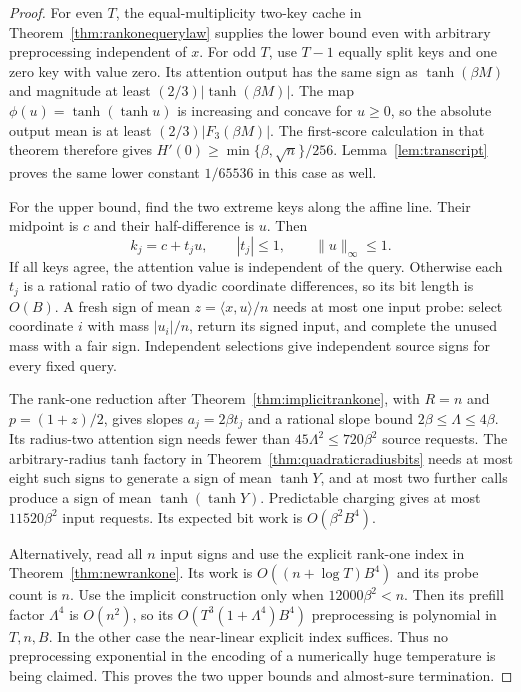 \begin{proof}
For even $T$, the equal-multiplicity two-key cache in
Theorem~\ref{thm:rankonequerylaw} supplies the lower bound even
with arbitrary preprocessing independent of $x$.
For odd $T$, use $T-1$ equally split keys and one zero key with
value zero. Its attention output has the same sign as
$\tanh(\beta M)$ and magnitude at least
$(2/3)|\tanh(\beta M)|$. The map
$\phi(u)=\tanh(\tanh u)$ is increasing and concave for $u\ge0$,
so the absolute output mean is at least $(2/3)|F_3(\beta M)|$.
The first-score calculation in that theorem therefore gives
$H'(0)\ge\min\{\beta,\sqrt n\}/256$.
Lemma~\ref{lem:transcript} proves the same lower constant
$1/65536$ in this case as well.

For the upper bound, find the two extreme keys along the affine line.
Their midpoint is $c$ and their half-difference is $u$. Then
\[
 k_j=c+t_ju,\qquad |t_j|\le1,\qquad \|u\|_\infty\le1.
\]
If all keys agree, the attention value is independent of the query.
Otherwise each $t_j$ is a rational ratio of two dyadic coordinate
differences, so its bit length is $O(B)$. A fresh sign of mean
$z=\langle x,u\rangle/n$ needs at most one input probe: select
coordinate $i$ with mass $|u_i|/n$, return its signed input, and
complete the unused mass with a fair sign. Independent selections
give independent source signs for every fixed query.

The rank-one reduction after Theorem~\ref{thm:implicitrankone}, with
$R=n$ and $p=(1+z)/2$, gives slopes $a_j=2\beta t_j$ and a rational
slope bound $2\beta\le\Lambda\le4\beta$.
Its radius-two attention sign needs fewer than
$45\Lambda^2\le720\beta^2$ source requests.
The arbitrary-radius tanh factory in
Theorem~\ref{thm:quadraticradiusbits} needs at most eight such signs
to generate a sign of mean $\tanh Y$, and at most two further
calls produce a sign of mean $\tanh(\tanh Y)$.
Predictable charging gives at most $11520\beta^2$ input requests.
Its expected bit work is $O(\beta^2B^4)$.

Alternatively, read all $n$ input signs and use the explicit
rank-one index in Theorem~\ref{thm:newrankone}. Its work is
$O((n+\log T)B^4)$ and its probe count is $n$.
Use the implicit construction only when $12000\beta^2<n$.
Then its prefill factor $\Lambda^4$ is $O(n^2)$, so its
$O(T^3(1+\Lambda^4)B^4)$ preprocessing is polynomial in
$T,n,B$. In the other case the near-linear explicit index
suffices. Thus no preprocessing exponential in the encoding of
a numerically huge temperature is being claimed.
This proves the two upper bounds and almost-sure termination.
\end{proof}

